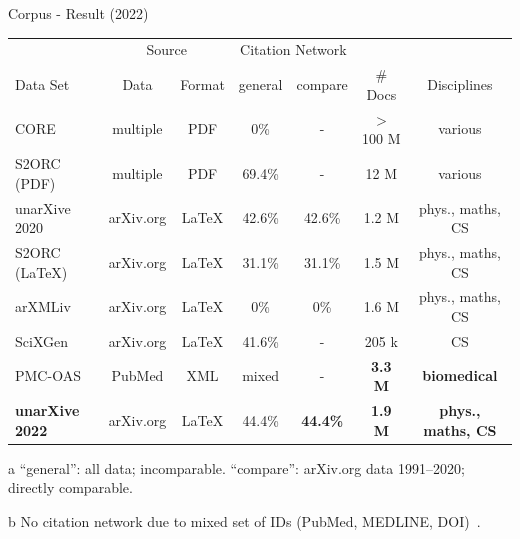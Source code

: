 \documentclass[en,16:9,smallfoot]{sdqbeamer}
\begin{document}
   \begin{frame}{Corpus - Result (2022)}
    \begin{table}
      \centering
      \begin{small}
     \begin{threeparttable}
      \begin{tabular}{lcccccc}
        \toprule
        \ & \multicolumn{2}{c}{Source} & \multicolumn{2}{c}{\hphantom{wi}Citation Network\tnote{a}} & \ & \ \\
        Data Set & Data & Format & general & compare & \# Docs & Disciplines \\
        \midrule
        CORE~\cite{core} & multiple & PDF & 0\% & - & $>$100 M & various \\
        S2ORC (PDF)~\cite{Lo2020} & multiple & PDF & 69.4\% & - & 12 M & various \\
        unarXive 2020~\cite{Saier2020} & arXiv.org & \LaTeX & 42.6\% & 42.6\% & 1.2 M & phys., maths, CS \\
        \midrule
        S2ORC (\LaTeX)~\cite{Lo2020} & arXiv.org & \LaTeX & 31.1\% & 31.1\% & 1.5 M & phys., maths, CS \\
        arXMLiv~\cite{arXMLiv} & arXiv.org & \LaTeX & 0\% & 0\% & 1.6 M & phys., maths, CS \\
        SciXGen~\cite{chen2021-scixgen} & arXiv.org & \LaTeX & 41.6\% & - & 205 k & CS \\
        PMC-OAS~\cite{pmc_oas} & PubMed & XML & mixed\tnote{b} & - & \textbf{3.3 M} & \textbf{biomedical} \\
        \textbf{unarXive 2022}~\cite{Saier2023unarXive} & arXiv.org & \LaTeX & 44.4\% & \textbf{44.4\%} & \textbf{1.9 M} & \textbf{phys., maths, CS} \\
        \bottomrule
      \end{tabular}
     \begin{tablenotes}
        \item[a] {\color{contextgrey}``general'': all data; incomparable. ``compare'': arXiv.org data 1991--2020; directly comparable.}
        \item[b] {\color{contextgrey}No citation network due to mixed set of IDs (PubMed, MEDLINE, DOI)~\cite{Gipp2015}.}
      \end{tablenotes}
    \end{threeparttable}
      \end{small}
    \end{table}
   \end{frame}
\end{document}
